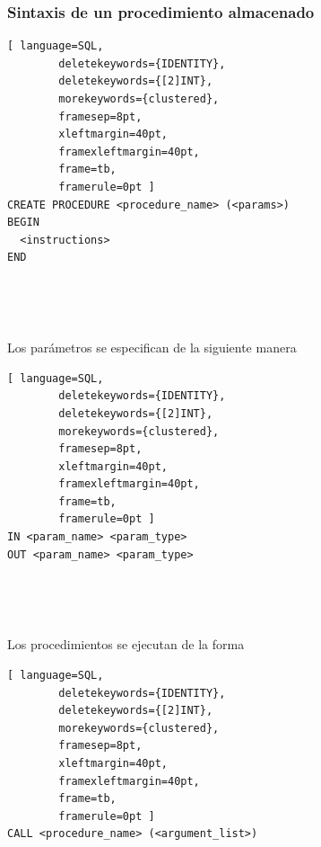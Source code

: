 \documentclass[
	10pt, %
	aspectratio=169, %
]{beamer}
\begin{document}
\begin{frame}[fragile]
	
	\frametitle{Sintaxis de un procedimiento almacenado}
	
		\begin{lstlisting}[ language=SQL,
		deletekeywords={IDENTITY},
		deletekeywords={[2]INT},
		morekeywords={clustered},
		framesep=8pt,
		xleftmargin=40pt,
		framexleftmargin=40pt,
		frame=tb,
		framerule=0pt ]
CREATE PROCEDURE <procedure_name> (<params>)
BEGIN
  <instructions>
END
\end{lstlisting}
	
	\ 
	
	\ 
	
	\pause
	
	Los parámetros se especifican de la siguiente manera
	 
	\begin{lstlisting}[ language=SQL,
		deletekeywords={IDENTITY},
		deletekeywords={[2]INT},
		morekeywords={clustered},
		framesep=8pt,
		xleftmargin=40pt,
		framexleftmargin=40pt,
		frame=tb,
		framerule=0pt ]
IN <param_name> <param_type>
OUT <param_name> <param_type>
\end{lstlisting}

	
	\ 

	\ 

	\pause
	
	Los procedimientos se ejecutan de la forma
	
	\begin{lstlisting}[ language=SQL,
		deletekeywords={IDENTITY},
		deletekeywords={[2]INT},
		morekeywords={clustered},
		framesep=8pt,
		xleftmargin=40pt,
		framexleftmargin=40pt,
		frame=tb,
		framerule=0pt ]
CALL <procedure_name> (<argument_list>)
\end{lstlisting}
	
\end{frame}

\end{document}
